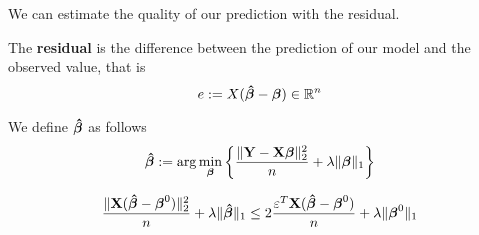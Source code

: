 We can estimate the quality of our prediction with the residual.

\begin{definition}[Residual]
    The \textbf{residual} is the difference between the prediction of our model and the observed value, that is
    \[
        e := X (\boldsymbol{\hat{\beta}} - \boldsymbol{\beta}) \in \mathbb{R}^n
    \]
\end{definition}

We define $\boldsymbol{\hat{\beta}}$ as follows
\begin{equation}
    \label{eqn: beta hat (LASSO)}
    \boldsymbol{\hat{\beta}}:=\arg \min _{\boldsymbol{\beta}}\left\{ \frac{\|\mathbf{Y}-\mathbf{X} \boldsymbol{\beta}\|_{2}^{2}}{n}+\lambda\|\boldsymbol{\beta}\|_{1} \right\}
\end{equation}

\begin{lemma}
    $$\frac{\| \mathbf{X} (\boldsymbol{\hat{\beta}}-\boldsymbol{\beta}^{0})\|_{2}^{2}}{n} + \lambda\|\boldsymbol{\hat{\beta}}\|_{1} \leq 2 \frac{\varepsilon^{T} \mathbf{X} (\boldsymbol{\hat{\beta}}-\boldsymbol{\beta}^{0})}{n}+\lambda \| \boldsymbol{\beta}^{0} \|_{1}$$
\end{lemma}
